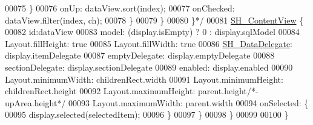 \begin{DoxyCode}
00075 \textcolor{comment}{                    \}}
00076 \textcolor{comment}{                    onUp: dataView.sort(index);}
00077 \textcolor{comment}{                    onChecked: dataView.filter(index, ch);}
00078 \textcolor{comment}{                \}}
00079 \textcolor{comment}{            \}}
00080 \textcolor{comment}{        \}*/}
00081         \hyperlink{classSH__ContentView}{SH\_ContentView} \{
00082             \textcolor{keywordtype}{id}:dataView
00083             model: (display.isEmpty) ? 0 : display.sqlModel
00084             Layout.fillHeight: \textcolor{keyword}{true}
00085             Layout.fillWidth: \textcolor{keyword}{true}
00086             \hyperlink{classSH__DataDelegate}{SH\_DataDelegate}: display.itemDelegate
00087             emptyDelegate:  display.emptyDelegate
00088             sectionDelegate:  display.sectionDelegate
00089             enabled: display.enabled
00090             Layout.minimumWidth: childrenRect.width
00091             Layout.minimumHeight: childrenRect.height
00092             Layout.maximumHeight: parent.height\textcolor{comment}{/*-upArea.height*/}
00093             Layout.maximumWidth: parent.width
00094             onSelected: \{
00095                 display.selected(selectedItem);
00096             \}
00097         \}
00098     \}
00099 
00100 \}
\end{DoxyCode}

